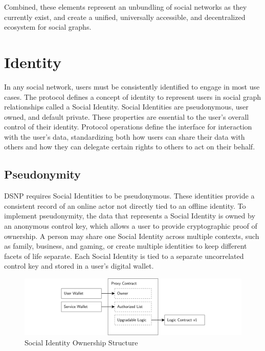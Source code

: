 \documentclass[12pt,letterpaper]{article}
\begin{document}
Combined, these elements represent an unbundling of social networks as they currently
exist, and create a unified, universally accessible, and decentralized ecosystem for
social graphs.

\section{Identity}\label{sec:identity}

In any social network, users must be consistently identified to engage in most use cases.
The protocol defines a concept of identity to represent users in social graph relationships
called a Social Identity. Social Identities are pseudonymous,\cite{anon_terminology} user
owned, and default private. These properties are essential to the user's overall control of
their identity. Protocol operations define the interface for interaction with the user's
data, standardizing both how users can share their data with others and how they can
delegate certain rights to others to act on their behalf.

\subsection{Pseudonymity}\label{sec:pseudonymity}

DSNP requires Social Identities to be pseudonymous. These identities provide a consistent
record of an online actor not directly tied to an offline identity. To implement
pseudonymity, the data that represents a Social Identity is owned by an anonymous control
key, which allows a user to provide cryptographic proof of ownership. A person may share one
Social Identity across multiple contexts, such as family, business, and gaming, or create
multiple identities to keep different facets of life separate. Each Social Identity is tied
to a separate uncorrelated control key and stored in a user's digital wallet.

\begin{figure}
	\includegraphics[width=\linewidth]{figures/Social Identity Ownership Structure.png}
	\caption{Social Identity Ownership Structure}
	\label{fig:1}
\end{figure}
\end{document}
